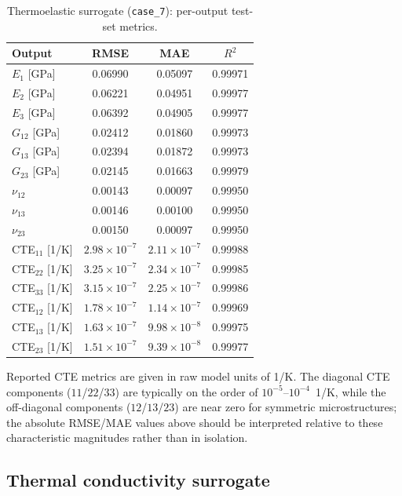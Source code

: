 \documentclass[preprint,review,10pt,number]{elsarticle}
\begin{document}
\begin{table}[h]
\centering
\caption{Thermoelastic surrogate (\texttt{case\_7}): per-output test-set metrics.}
\label{tab:app_thermo_per_output}
\begin{tabular}{lccc}
\toprule
Output & RMSE & MAE & $R^2$ \\
\midrule
$E_1$ [GPa]      & 0.06990 & 0.05097 & 0.99971 \\
$E_2$ [GPa]      & 0.06221 & 0.04951 & 0.99977 \\
$E_3$ [GPa]      & 0.06392 & 0.04905 & 0.99977 \\
$G_{12}$ [GPa]   & 0.02412 & 0.01860 & 0.99973 \\
$G_{13}$ [GPa]   & 0.02394 & 0.01872 & 0.99973 \\
$G_{23}$ [GPa]   & 0.02145 & 0.01663 & 0.99979 \\
$\nu_{12}$       & 0.00143 & 0.00097 & 0.99950 \\
$\nu_{13}$       & 0.00146 & 0.00100 & 0.99950 \\
$\nu_{23}$       & 0.00150 & 0.00097 & 0.99950 \\
CTE$_{11}$ [1/K] & $2.98\times10^{-7}$ & $2.11\times10^{-7}$ & 0.99988 \\
CTE$_{22}$ [1/K] & $3.25\times10^{-7}$ & $2.34\times10^{-7}$ & 0.99985 \\
CTE$_{33}$ [1/K] & $3.15\times10^{-7}$ & $2.25\times10^{-7}$ & 0.99986 \\
CTE$_{12}$ [1/K] & $1.78\times10^{-7}$ & $1.14\times10^{-7}$ & 0.99969 \\
CTE$_{13}$ [1/K] & $1.63\times10^{-7}$ & $9.98\times10^{-8}$ & 0.99975 \\
CTE$_{23}$ [1/K] & $1.51\times10^{-7}$ & $9.39\times10^{-8}$ & 0.99977 \\
\bottomrule
\end{tabular}
\end{table}

Reported CTE metrics are given in raw model units of 1/K. The
diagonal CTE components ($11$/$22$/$33$) are typically on the order
of $10^{-5}$--$10^{-4}$~1/K, while the off-diagonal components
($12$/$13$/$23$) are near zero for symmetric microstructures; the
absolute RMSE/MAE values above should be interpreted relative to
these characteristic magnitudes rather than in isolation.

\FloatBarrier
\subsection{Thermal conductivity surrogate}
\label{app:thermal_surrogate}
\end{document}

